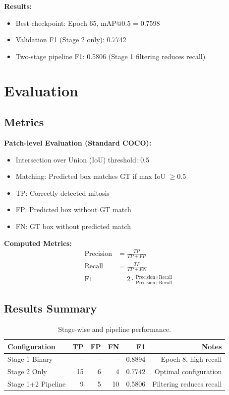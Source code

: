 \documentclass[11pt,a4paper]{article}
\begin{document}
\textbf{Results:}
\begin{itemize}
    \item Best checkpoint: Epoch 65, mAP@0.5 = 0.7598
    \item Validation F1 (Stage 2 only): 0.7742
    \item Two-stage pipeline F1: 0.5806 (Stage 1 filtering reduces recall)
\end{itemize}

\section{Evaluation}

\subsection{Metrics}

\textbf{Patch-level Evaluation (Standard COCO):}
\begin{itemize}
    \item Intersection over Union (IoU) threshold: 0.5
    \item Matching: Predicted box matches GT if max IoU $\geq 0.5$
    \item TP: Correctly detected mitosis
    \item FP: Predicted box without GT match
    \item FN: GT box without predicted match
\end{itemize}

\textbf{Computed Metrics:}
\begin{align}
\text{Precision} &= \frac{TP}{TP + FP} \label{eq:precision} \\
\text{Recall} &= \frac{TP}{TP + FN} \label{eq:recall} \\
\text{F1} &= 2 \cdot \frac{\text{Precision} \times \text{Recall}}{\text{Precision} + \text{Recall}} \label{eq:f1}
\end{align}

\subsection{Results Summary}

\begin{table}[h]
\centering
\caption{Stage-wise and pipeline performance.}
\label{tab:performance}
\begin{tabular}{lrrrrr}
\toprule
\textbf{Configuration} & \textbf{TP} & \textbf{FP} & \textbf{FN} & \textbf{F1} & \textbf{Notes} \\
\midrule
Stage 1 Binary & - & - & - & 0.8894 & Epoch 8, high recall \\
Stage 2 Only & 15 & 6 & 4 & 0.7742 & Optimal configuration \\
Stage 1+2 Pipeline & 9 & 5 & 10 & 0.5806 & Filtering reduces recall \\
\bottomrule
\end{tabular}
\end{table}
\end{document}
